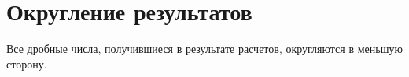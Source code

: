 \section{Округление результатов}
Все дробные числа, получившиеся в результате расчетов, округляются в меньшую сторону.